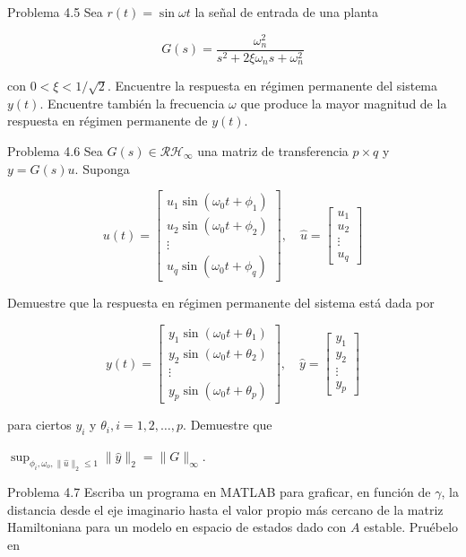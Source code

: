 Problema 4.5 Sea $r(t)=\sin \omega t$ la señal de entrada de una planta

$$
G(s)=\frac{\omega_{n}^{2}}{s^{2}+2 \xi \omega_{n} s+\omega_{n}^{2}}
$$

con $0<\xi<1 / \sqrt{2}$. Encuentre la respuesta en régimen permanente del sistema $y(t)$. Encuentre también la frecuencia $\omega$ que produce la mayor magnitud de la respuesta en régimen permanente de $y(t)$.

Problema 4.6 Sea $G(s) \in \mathcal{R} \mathcal{H}_{\infty}$ una matriz de transferencia $p \times q$ y $y=G(s) u$. Suponga

$$
u(t)=\left[\begin{array}{c}
u_{1} \sin \left(\omega_{0} t+\phi_{1}\right) \\
u_{2} \sin \left(\omega_{0} t+\phi_{2}\right) \\
\vdots \\
u_{q} \sin \left(\omega_{0} t+\phi_{q}\right)
\end{array}\right], \quad \hat{u}=\left[\begin{array}{c}
u_{1} \\
u_{2} \\
\vdots \\
u_{q}
\end{array}\right]
$$

Demuestre que la respuesta en régimen permanente del sistema está dada por

$$
y(t)=\left[\begin{array}{c}
y_{1} \sin \left(\omega_{0} t+\theta_{1}\right) \\
y_{2} \sin \left(\omega_{0} t+\theta_{2}\right) \\
\vdots \\
y_{p} \sin \left(\omega_{0} t+\theta_{p}\right)
\end{array}\right], \quad \hat{y}=\left[\begin{array}{c}
y_{1} \\
y_{2} \\
\vdots \\
y_{p}
\end{array}\right]
$$

para ciertos $y_{i}$ y $\theta_{i}, i=1,2, \ldots, p$. Demuestre que

$\sup _{\phi_{i}, \omega_{o},\|\hat{u}\|_{2} \leq 1}\|\hat{y}\|_{2}=\|G\|_{\infty}$.

Problema 4.7 Escriba un programa en MATLAB para graficar, en función de $\gamma$, la distancia desde el eje imaginario hasta el valor propio más cercano de la matriz Hamiltoniana para un modelo en espacio de estados dado con $A$ estable. Pruébelo en

